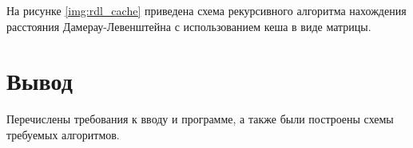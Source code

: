 \newpage

На рисунке \ref{img:rdl_cache} приведена схема рекурсивного алгоритма нахождения расстояния Дамерау-Левенштейна с использованием кеша в виде матрицы.


\newpage

\section*{Вывод}

Перечислены требования к вводу и программе, а также были построены схемы требуемых алгоритмов.






